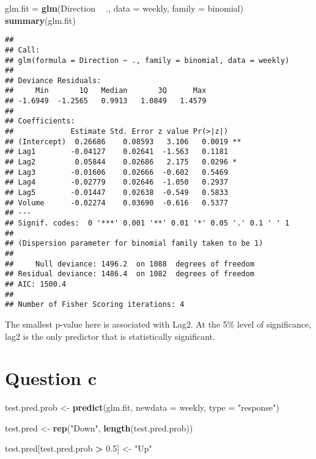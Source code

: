 \documentclass[]{article}
\newenvironment{Shaded}{\begin{snugshade}}{\end{snugshade}}
\newcommand{\KeywordTok}[1]{\textcolor[rgb]{0.13,0.29,0.53}{\textbf{#1}}}
\newcommand{\DataTypeTok}[1]{\textcolor[rgb]{0.13,0.29,0.53}{#1}}
\newcommand{\FloatTok}[1]{\textcolor[rgb]{0.00,0.00,0.81}{#1}}
\newcommand{\StringTok}[1]{\textcolor[rgb]{0.31,0.60,0.02}{#1}}
\newcommand{\OperatorTok}[1]{\textcolor[rgb]{0.81,0.36,0.00}{\textbf{#1}}}
\newcommand{\NormalTok}[1]{#1}
\begin{document}
\begin{Shaded}
\begin{Highlighting}[]
\NormalTok{glm.fit =}\StringTok{ }\KeywordTok{glm}\NormalTok{(Direction }\OperatorTok{~}\StringTok{ }\NormalTok{., }\DataTypeTok{data =}\NormalTok{ weekly, }\DataTypeTok{family =}\NormalTok{ binomial)}
\KeywordTok{summary}\NormalTok{(glm.fit)}
\end{Highlighting}
\end{Shaded}

\begin{verbatim}
## 
## Call:
## glm(formula = Direction ~ ., family = binomial, data = weekly)
## 
## Deviance Residuals: 
##     Min       1Q   Median       3Q      Max  
## -1.6949  -1.2565   0.9913   1.0849   1.4579  
## 
## Coefficients:
##             Estimate Std. Error z value Pr(>|z|)   
## (Intercept)  0.26686    0.08593   3.106   0.0019 **
## Lag1        -0.04127    0.02641  -1.563   0.1181   
## Lag2         0.05844    0.02686   2.175   0.0296 * 
## Lag3        -0.01606    0.02666  -0.602   0.5469   
## Lag4        -0.02779    0.02646  -1.050   0.2937   
## Lag5        -0.01447    0.02638  -0.549   0.5833   
## Volume      -0.02274    0.03690  -0.616   0.5377   
## ---
## Signif. codes:  0 '***' 0.001 '**' 0.01 '*' 0.05 '.' 0.1 ' ' 1
## 
## (Dispersion parameter for binomial family taken to be 1)
## 
##     Null deviance: 1496.2  on 1088  degrees of freedom
## Residual deviance: 1486.4  on 1082  degrees of freedom
## AIC: 1500.4
## 
## Number of Fisher Scoring iterations: 4
\end{verbatim}

The smallest p-value here is associated with Lag2. At the 5\% level of
significance, lag2 is the only predictor that is statistically
significant.

\section{Question c}\label{question-c}

\begin{Shaded}
\begin{Highlighting}[]
\NormalTok{test.pred.prob  <-}\StringTok{ }\KeywordTok{predict}\NormalTok{(glm.fit, }\DataTypeTok{newdata =}\NormalTok{ weekly, }\DataTypeTok{type =} \StringTok{"response"}\NormalTok{)}

\NormalTok{test.pred <-}\StringTok{ }\KeywordTok{rep}\NormalTok{(}\StringTok{"Down"}\NormalTok{, }\KeywordTok{length}\NormalTok{(test.pred.prob))}

\NormalTok{test.pred[test.pred.prob }\OperatorTok{>}\StringTok{ }\FloatTok{0.5}\NormalTok{] <-}\StringTok{ "Up"}
\end{Highlighting}
\end{Shaded}
\end{document}
